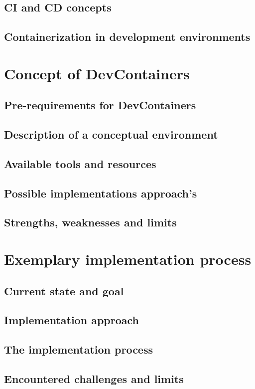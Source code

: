 \documentclass[12pt, a4paper]{article}
\begin{document}
    \subsection{\acl{CI} and \acl{CD} concepts}
    \subsection{Containerization in development environments}
\section{Concept of DevContainers}
    \subsection{Pre-requirements for DevContainers}
    \subsection{Description of a conceptual environment}
    \subsection{Available tools and resources}
    \subsection{Possible implementations approach's}
    \subsection{Strengths, weaknesses and limits}
\section{Exemplary implementation process}
    \subsection{Current state and goal}
    \subsection{Implementation approach}
    \subsection{The implementation process}
    \subsection{Encountered challenges and limits}
\end{document}
